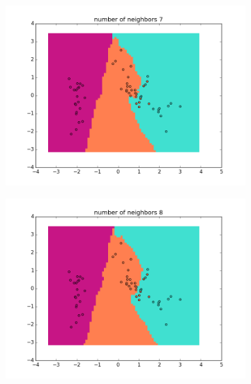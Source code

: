 \documentclass{article}
\begin{document}
\begin{center}
\begin{figure}
\centering  
        \begin{subfigure}[b]{0.48\textwidth}
                \centering
                \includegraphics[width=\linewidth]{figure_8}
        \end{subfigure}\hfill
        \begin{subfigure}[b]{0.48\textwidth}
                \centering
                \includegraphics[width=\linewidth]{figure_9}
        \end{subfigure}
        \label{fig:5}
\end{figure}


\end{center}
\end{document}
